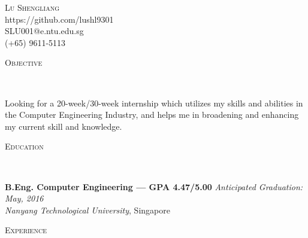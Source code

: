 \documentclass[a4paper]{article}
\newenvironment{changemargin}[2]{%
  \begin{list}{}{%
      \setlength{\topsep}{0pt}%
      \setlength{\leftmargin}{#1}%
      \setlength{\rightmargin}{#2}%
      \setlength{\listparindent}{\parindent}%
      \setlength{\itemindent}{\parindent}%
      \setlength{\parsep}{\parskip}%
    }%
  \item[]}{\end{list}
}
\newcommand{\lineover}{
  \begin{changemargin}{-0.05in}{-0.05in}
    \vspace*{-8pt}
    \hrulefill \\
    \vspace*{-2pt}
  \end{changemargin}
}
\newcommand{\header}[1]{
  \begin{changemargin}{-0.5in}{-0.5in}
    \scshape{#1}\\
    \lineover
  \end{changemargin}
}
\newcommand{\contact}[4]{
  \begin{changemargin}{-0.5in}{-0.5in}
    \begin{center}
      {\Large \scshape {#1}}\\ \smallskip
      {#2}\\ \smallskip 
      {#3}\\ \smallskip
      {#4}\smallskip
    \end{center}
  \end{changemargin}
}
\newenvironment{body}
{
\vspace*{-16pt}
\begin{changemargin}{-0.25in}{-0.5in}
}	
{
\end{changemargin}
}
\begin{document}
\contact{Lu Shengliang}{https://github.com/lushl9301}{SLU001@e.ntu.edu.sg}{(+65) 9611-5113}


\header{Objective}

\begin{body}
  \vspace{14pt}
  Looking for a 20-week/30-week internship which utilizes my skills and abilities in the Computer Engineering Industry, and helps me in broadening and enhancing my current skill and knowledge.
\end{body}

\smallskip


\header{Education}

\begin{body}
  \vspace{14pt}
  \textbf{B.Eng. Computer Engineering --- GPA 4.47/5.00} \hfill \emph{Anticipated Graduation: May, 2016} \\
  \emph{Nanyang Technological University}, Singapore\\
\end{body}

\smallskip


\header{Experience}
\end{document}
